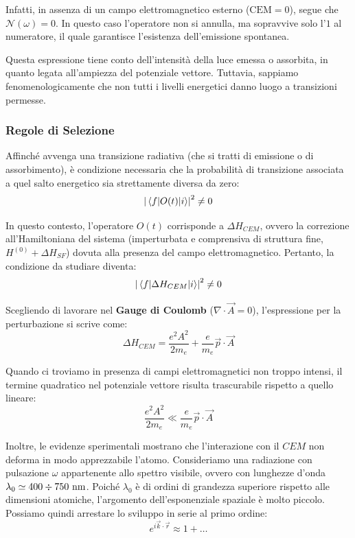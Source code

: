 Infatti, in assenza di un campo elettromagnetico esterno (\( \text{CEM} = 0 \)), segue che \( \mathcal{N}(\omega) = 0 \). In questo caso l'operatore non si annulla, ma sopravvive solo l'\( 1 \) al numeratore, il quale garantisce l'esistenza dell'emissione spontanea.

Questa espressione tiene conto dell'intensità della luce emessa o assorbita, in quanto legata all'ampiezza del potenziale vettore. Tuttavia, sappiamo fenomenologicamente che non tutti i livelli energetici danno luogo a transizioni permesse.

\subsubsection{Regole di Selezione}
Affinché avvenga una transizione radiativa (che si tratti di emissione o di assorbimento), è condizione necessaria che la probabilità di transizione associata a quel salto energetico sia strettamente diversa da zero:
\begin{equation}
    \abs{\mel{f}{O(t)}{i}}^2 \neq 0
\end{equation}

In questo contesto, l'operatore \( O(t) \) corrisponde a \( \Delta H_{CEM} \), ovvero la correzione all'Hamiltoniana del sistema (imperturbata e comprensiva di struttura fine, \( H^{(0)} + \Delta H_{SF} \)) dovuta alla presenza del campo elettromagnetico. Pertanto, la condizione da studiare diventa:
\begin{equation}
    \abs{\mel{f}{\Delta H_{CEM}}{i}}^2 \neq 0
\end{equation}

Scegliendo di lavorare nel \textbf{Gauge di Coulomb} (\( \nabla \cdot \vec{A} = 0 \)), l'espressione per la perturbazione si scrive come:
\begin{equation}
    \Delta H_{CEM} = \frac{e^2 A^2}{2m_e} + \frac{e}{m_e} \vec{p} \cdot \vec{A}
\end{equation}

Quando ci troviamo in presenza di campi elettromagnetici non troppo intensi, il termine quadratico nel potenziale vettore risulta trascurabile rispetto a quello lineare:
\begin{equation*}
    \frac{e^2 A^2}{2m_e} \ll \frac{e}{m_e} \vec{p} \cdot \vec{A}
\end{equation*}

Inoltre, le evidenze sperimentali mostrano che l'interazione con il \( CEM \) non deforma in modo apprezzabile l'atomo. 
Consideriamo una radiazione con pulsazione \( \omega \) appartenente allo spettro visibile, ovvero con lunghezze d'onda \( \lambda_0 \simeq 400 \divisionsymbol 750 \text{ nm} \). 
Poiché \( \lambda_0 \) è di ordini di grandezza superiore rispetto alle dimensioni atomiche, l'argomento dell'esponenziale spaziale è molto piccolo. 
Possiamo quindi arrestare lo sviluppo in serie al primo ordine:
\begin{equation}
    e^{i\vec{k}\cdot\vec{r}} \approx 1 + \dots
\end{equation}

